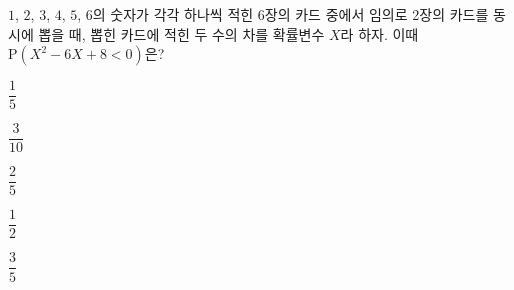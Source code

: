 $1$, $2$, $3$, $4$, $5$, $6$의 숫자가 각각 하나씩 적힌 6장의 카드 중에서 임의로 2장의 카드를 동시에 뽑을 때, 뽑힌 카드에 적힌 두 수의 차를 확률변수 $X$라 하자. 이때 $\mathrm{P}(X^2-6X+8<0)$은?
\begin{choices32}{\rule[-3ex]{0pt}{8ex}$\dfrac{1}{5}$}{\rule[-3ex]{0pt}{8ex}$\dfrac{3}{10}$}{\rule[-3ex]{0pt}{8ex}$\dfrac{2}{5}$}{\rule[-3ex]{0pt}{8ex}$\dfrac{1}{2}$}{\rule[-3ex]{0pt}{8ex}$\dfrac{3}{5}$}\end{choices32}

